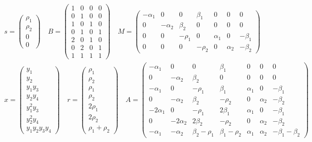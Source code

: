 \documentclass{article}
\begin{document}
\begin{equation}
\begin{aligned}
s = \begin{pmatrix}
\rho_1\\
\rho_2\\
0 \\
0
\end{pmatrix}
\quad 
B = \begin{pmatrix}
1 & 0 & 0 & 0\\
0 & 1 & 0 & 0\\
1 & 0 & 1 & 0\\
0 & 1 & 0 & 1\\
2 & 0 & 1 & 0\\
0 & 2 & 0 & 1\\
1 & 1 & 1 & 1
\end{pmatrix}
\quad 
M = \begin{pmatrix}
-\alpha_1  & 0  & 0 & \beta_1 & 0 & 0 & 0\\
0 & -\alpha_2  & \beta_2 & 0 & 0 & 0 & 0\\
0 & 0 & -\rho_1 & 0 & \alpha_1 & 0 & -\beta_1\\
0 & 0 & 0 & -\rho_2 & 0 & \alpha_2 & -\beta_2
\end{pmatrix}\\
x = \begin{pmatrix}
y_1\\
y_2\\
y_1 y_3\\
y_2 y_4\\
y_1^2 y_3\\
y_2^2 y_4\\
y_1 y_2 y_3 y_4
\end{pmatrix}
\quad
r = \begin{pmatrix}
\rho_1 \\
\rho_2 \\
\rho_1 \\
\rho_2 \\
2 \rho_1 \\
2 \rho_2 \\
\rho_1+\rho_2
\end{pmatrix}
\quad
A = \begin{pmatrix}
-\alpha_1 & 0 & 0 & \beta_1 & 0 & 0 & 0 \\
 0 & -\alpha_2 & \beta_2 & 0 & 0 & 0 & 0 \\
 -\alpha_1 & 0 & -\rho_1 & \beta_1 & \alpha_1 & 0 & -\beta_1 \\
 0 & -\alpha_2 & \beta_2 & -\rho_2 & 0 & \alpha_2 & -\beta_2 \\
 -2 \alpha_1 & 0 & -\rho_1 & 2 \beta_1 & \alpha_1 & 0 & -\beta_1 \\
 0 & -2 \alpha_2 & 2 \beta_2 & -\rho_2 & 0 & \alpha_2 & -\beta_2 \\
 -\alpha_1 & -\alpha_2 & \beta_2-\rho_1 & \beta_1-\rho_2 & \alpha_1 & \alpha_2 & -\beta_1-\beta_2
\end{pmatrix}
\end{aligned}
\end{equation}
\end{document}
